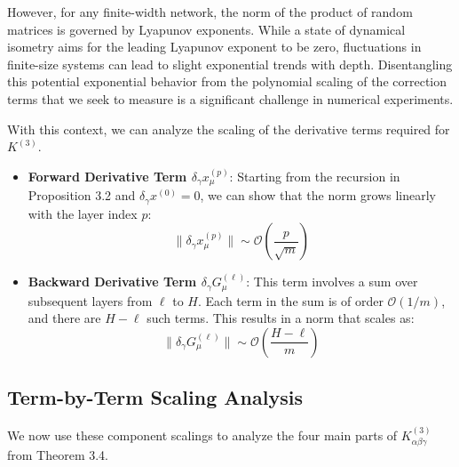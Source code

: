 \documentclass{article}
\newcommand{\Order}{\mathcal{O}}
\begin{document}
However, for any finite-width network, the norm of the product of random matrices is governed by Lyapunov exponents. While a state of dynamical isometry aims for the leading Lyapunov exponent to be zero, fluctuations in finite-size systems can lead to slight exponential trends with depth. Disentangling this potential exponential behavior from the polynomial scaling of the correction terms that we seek to measure is a significant challenge in numerical experiments.

With this context, we can analyze the scaling of the derivative terms required for $K^{(3)}$.
\begin{itemize}
    \item \textbf{Forward Derivative Term $\delta_\gamma x^{(p)}_\mu$}: Starting from the recursion in Proposition 3.2 and $\delta_\gamma x^{(0)}=0$, we can show that the norm grows linearly with the layer index $p$:
    \[
    \|\delta_\gamma x^{(p)}_\mu\| \sim \Order\left(\frac{p}{\sqrt{m}}\right)
    \]
    \item \textbf{Backward Derivative Term $\delta_\gamma G^{(\ell)}_\mu$}: This term involves a sum over subsequent layers from $\ell$ to $H$. Each term in the sum is of order $\Order(1/m)$, and there are $H-\ell$ such terms. This results in a norm that scales as:
    \[
    \|\delta_\gamma G^{(\ell)}_\mu\| \sim \Order\left(\frac{H-\ell}{m}\right)
    \]
\end{itemize}


\subsection{Term-by-Term Scaling Analysis}
We now use these component scalings to analyze the four main parts of $K^{(3)}_{\alpha\beta\gamma}$ from Theorem 3.4.
\end{document}
